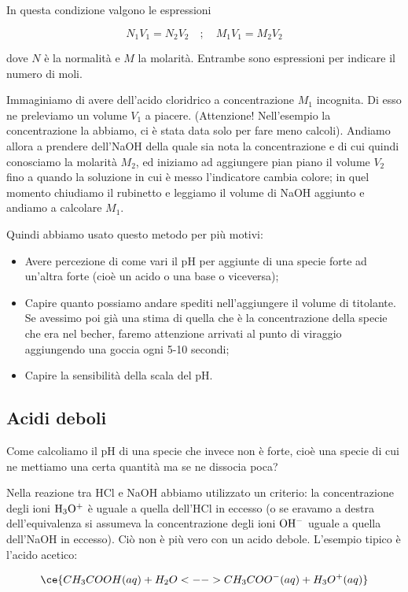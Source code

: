 In questa condizione valgono le espressioni

$$N_1V_1=N_2V_2
\quad
;
\quad
M_1V_1=M_2V_2$$

dove $N$ è la normalità e $M$ la molarità. Entrambe sono espressioni per indicare il numero di moli.

Immaginiamo di avere dell'acido cloridrico a concentrazione $M_1$ incognita. Di esso ne preleviamo un volume $V_1$ a piacere. (Attenzione! Nell'esempio la concentrazione la abbiamo, ci è stata data solo per fare meno calcoli). Andiamo allora a prendere dell'NaOH della quale sia nota la concentrazione e di cui quindi conosciamo la molarità $M_2$, ed iniziamo ad aggiungere pian piano il volume $V_2$ fino a quando la soluzione in cui è messo l'indicatore cambia colore; in quel momento chiudiamo il rubinetto e leggiamo il volume di NaOH aggiunto e andiamo a calcolare $M_1$.

\vspace{0.2cm}Quindi abbiamo usato questo metodo per più motivi:

\begin{itemize}
    \item Avere percezione di come vari il pH per aggiunte di una specie forte ad un'altra forte (cioè un acido o una base o viceversa);
    \item Capire quanto possiamo andare spediti nell'aggiungere il volume di titolante. Se avessimo poi già una stima di quella che è la concentrazione della specie che era nel becher, faremo attenzione arrivati al punto di viraggio aggiungendo una goccia ogni 5-10 secondi;
    \item Capire la sensibilità della scala del pH.
\end{itemize}

\subsection{Acidi deboli}
Come calcoliamo il pH di una specie che invece non è forte, cioè una specie di cui ne mettiamo una certa quantità ma se ne dissocia poca?

Nella reazione tra HCl e NaOH abbiamo utilizzato un criterio: la concentrazione degli ioni $\rm H_3O^+$ è uguale a quella dell'HCl in eccesso (o se eravamo a destra dell'equivalenza si assumeva la concentrazione degli ioni $\rm OH^-$ uguale a quella dell'NaOH in eccesso). Ciò non è più vero con un acido debole. L'esempio tipico è l'acido acetico:

$$\ce{CH_3COOH(aq) + H_2O <--> CH_3COO^-(aq) + H_3O^+(aq)}$$

